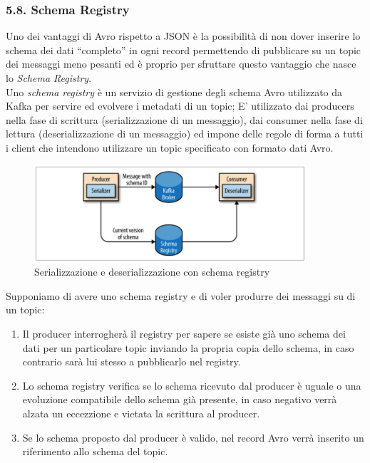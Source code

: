 \documentclass[]{article}
\providecommand{\tightlist}{%
  \setlength{\itemsep}{0pt}\setlength{\parskip}{0pt}}
\begin{document}
\newpage

\subsubsection{5.8. Schema Registry}\label{schema-registry}

Uno dei vantaggi di Avro rispetto a JSON è la possibilità di non dover
inserire lo schema dei dati ``completo'' in ogni record permettendo di
pubblicare su un topic dei messaggi meno pesanti ed è proprio per
sfruttare questo vantaggio che nasce lo \emph{Schema Registry}.\\
Uno \emph{schema registry} è un servizio di gestione degli schema Avro
utilizzato da Kafka per servire ed evolvere i metadati di un topic; E'
utilizzato dai producers nella fase di scrittura (serializzazione di un
messaggio), dai consumer nella fase di lettura (deserializzazione di un
messaggio) ed impone delle regole di forma a tutti i client che
intendono utilizzare un topic specificato con formato dati Avro.

\begin{figure}
\centering
\includegraphics[width=0.90000\textwidth]{../images/schema-registry.png}
\caption{Serializzazione e deserializzazione con schema registry
\label{figure_5}}
\end{figure}

Supponiamo di avere uno schema registry e di voler produrre dei messaggi
su di un topic:

\begin{enumerate}
\def\labelenumi{\arabic{enumi}.}
\tightlist
\item
  Il producer interrogherà il registry per sapere se esiste già uno
  schema dei dati per un particolare topic inviando la propria copia
  dello schema, in caso contrario sarà lui stesso a pubblicarlo nel
  registry.
\item
  Lo schema registry verifica se lo schema ricevuto dal producer è
  uguale o una evoluzione compatibile dello schema già presente, in caso
  negativo verrà alzata un eccezzione e vietata la scrittura al
  producer.
\item
  Se lo schema proposto dal producer è valido, nel record Avro verrà
  inserito un riferimento allo schema del topic.
\end{enumerate}
\end{document}
